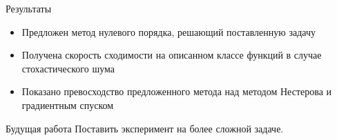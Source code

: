 \documentclass{beamer}
\begin{document}
%


\begin{frame}{Результаты}
\begin{itemize}
 \item Предложен метод нулевого порядка, решающий поставленную задачу
 \item Получена скорость сходимости на описанном классе функций в случае стохастического шума
 \item Показано превосходство предложенного метода над методом Нестерова и градиентным спуском
\end{itemize}

\begin{block}{Будущая работа}
Поставить эксперимент на более сложной задаче.
\end{block}

\end{frame}
\end{document}
